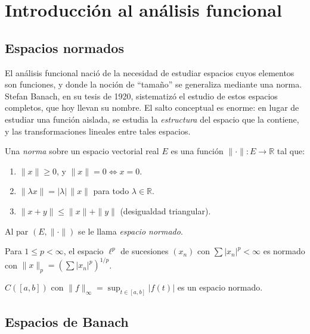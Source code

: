 \chapter{Introducción al análisis funcional}
\label{ch:analisis-funcional}

\section{Espacios normados}

El análisis funcional nació de la necesidad de estudiar espacios cuyos elementos son funciones, y donde la noción de ``tamaño'' se generaliza mediante una norma. Stefan Banach, en su tesis de 1920, sistematizó el estudio de estos espacios completos, que hoy llevan su nombre. El salto conceptual es enorme: en lugar de estudiar una función aislada, se estudia la \emph{estructura} del espacio que la contiene, y las transformaciones lineales entre tales espacios.

\begin{definition}
\label{def:norma}
Una \emph{norma} sobre un espacio vectorial real $E$ es una función $\|\cdot\|\colon E\to\mathbb{R}$ tal que:
\begin{enumerate}
  \item[(i)] $\|x\|\geq 0$, y $\|x\|=0\Leftrightarrow x=0$.
  \item[(ii)] $\|\lambda x\|=|\lambda|\,\|x\|$ para todo $\lambda\in\mathbb{R}$.
  \item[(iii)] $\|x+y\|\leq\|x\|+\|y\|$ (desigualdad triangular).
\end{enumerate}
Al par $(E,\|\cdot\|)$ se le llama \emph{espacio normado}.
\end{definition}

\begin{example}
\label{ej:lp-normado}
Para $1\leq p<\infty$, el espacio $\ell^p$ de sucesiones $(x_n)$ con $\sum|x_n|^p<\infty$ es normado con $\|x\|_p=(\sum|x_n|^p)^{1/p}$.
\end{example}

\begin{example}
\label{ej:cb-normado}
$C([a,b])$ con $\|f\|_\infty=\sup_{t\in[a,b]}|f(t)|$ es un espacio normado.
\end{example}

\section{Espacios de Banach}

